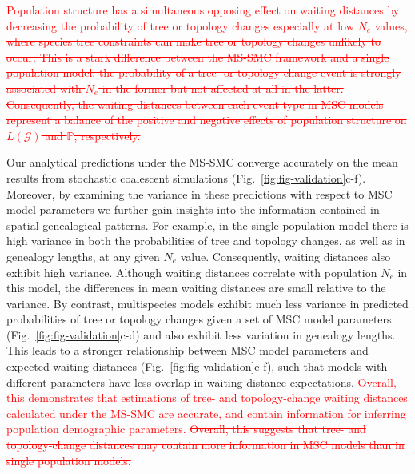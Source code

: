 \documentclass[11pt]{article}
\begin{document}
% 
% 
\textcolor{red}{\sout{
Population structure has a simultaneous opposing effect on waiting distances
by decreasing the probability of tree or topology changes 
especially at low $N_e$ values,
where species tree constraints can make tree or topology changes unlikely
to occur. This is a stark difference between the MS-SMC framework and a 
single population model: the probability of a tree- or topology-change 
event is strongly associated with $N_e$ in the former but not affected 
at all in the latter. 
Consequently, the waiting distances between each event type in MSC models 
represent a balance 
of the positive and negative effects of population structure on 
$L(\mathcal{G})$ and $\mathbb{P}$, respectively.
}}

Our analytical predictions under the MS-SMC converge accurately on 
the mean results from stochastic coalescent simulations 
(Fig.~\ref{fig:fig-validation}c-f). 
Moreover, by examining the variance in these predictions with 
respect to MSC model parameters we further gain insights into 
the information contained in spatial genealogical patterns.
For example, in the single population model there is high variance 
in both the probabilities of tree and topology changes, as well as in genealogy
lengths, at any given $N_e$ value. Consequently, waiting distances also 
exhibit high variance. Although waiting distances correlate with population $N_e$ 
in this model, the differences in mean waiting distances are small relative to the variance. 
By contrast, multispecies models exhibit much less variance in predicted probabilities 
of tree or topology changes given a set of MSC model parameters 
(Fig.~\ref{fig:fig-validation}c-d) and also exhibit less variation in genealogy
lengths. This leads to a stronger relationship between MSC model parameters and 
expected waiting distances (Fig.~\ref{fig:fig-validation}e-f), such that models
with different parameters have less overlap in waiting distance expectations.
\textcolor{red}{
Overall, this demonstrates that estimations of tree- and topology-change
waiting distances calculated under the MS-SMC are accurate, and contain 
information for inferring population demographic parameters.
}
\textcolor{red}{\sout{
Overall, this suggests that tree- and topology-change distances may contain more 
information in MSC models than in single population models.
}}
\end{document}
